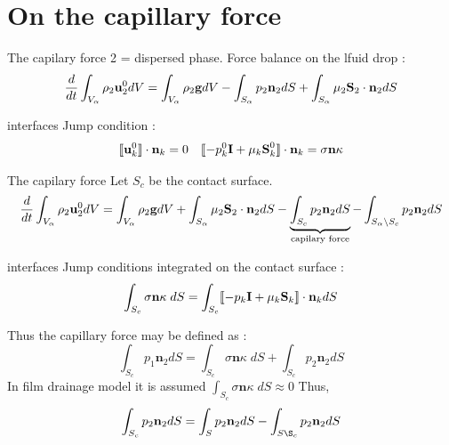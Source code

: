 \documentclass{sintefbeamer}
\begin{document}
\section*{On the capillary force }

\begin{frame}
  {The capilary force}
  2 = dispersed phase. 
  Force balance on the lfuid drop :
  \begin{equation*}
    \frac{d}{dt} \int_{V_\alpha} \rho_2 \textbf{u}^0_2 dV
    = 
    \int_{V_\alpha} \rho_2 \textbf{g} dV
    - \int_{S_\alpha} p_2 \textbf{n}_2 dS
    + \int_{S_\alpha} \mu_2 \textbf{S}_2 \cdot \textbf{n}_2 dS
  \end{equation*}

  interfaces Jump condition :
  \begin{align*}
    \llbracket \textbf{u}_k^0 \rrbracket \cdot \textbf{n}_k = 0
    &&
    \llbracket -p_k^0 \textbf{I}+ \mu_k \textbf{S}_k^0 \rrbracket \cdot \textbf{n}_k 
    =
    \sigma\textbf{n}\kappa
    \label{eq:surface_tension}
\end{align*}

\end{frame}

\begin{frame}
  {The capilary force}
  Let $S_c$ be the contact surface.
  \begin{equation*}
    \frac{d}{dt} \int_{V_\alpha} \rho_2 \textbf{u}^0_2 dV
    = 
    \int_{V_\alpha} \rho_2 \textbf{g} dV
    + \int_{S_\alpha} \mu_2 \textbf{S}_2 \cdot \textbf{n}_2 dS
    - \underbrace{\int_{S_c} p_2 \textbf{n}_2 dS}_\text{capilary force}
    - \int_{S_\alpha \backslash S_c} p_2 \textbf{n}_2 dS
  \end{equation*}

  interfaces Jump conditions integrated  on the contact surface :
  \begin{equation}
    \int_{S_c} \sigma\textbf{n}\kappa \; dS
    =
    \int_{S_c} \llbracket -p_k \textbf{I}+ \mu_k \textbf{S}_k \rrbracket \cdot \textbf{n}_k dS
\end{equation}

Thus the capillary force may be defined as : 
  \begin{equation}
    \int_{ S_c} p_1 \textbf{n}_2 dS
    =
    \int_{S_c} \sigma\textbf{n}\kappa \; dS
    + \int_{ S_c} p_2 \textbf{n}_2 dS
  \end{equation}
  In film drainage model it is assumed $\int_{S_c} \sigma\textbf{n}\kappa \; dS \approx 0 $ Thus, 
  \begin{equation*}
    \int_{ S_c} p_2 \textbf{n}_2 dS
    = \int_{ S} p_2 \textbf{n}_2 dS
    - \int_{ S \S_c} p_2 \textbf{n}_2 dS
  \end{equation*}

\end{frame}
\end{document}
